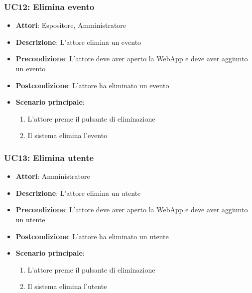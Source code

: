\subsubsection{UC12: Elimina evento}
\label{subsubsec:uc12}
\begin{itemize}
    \item \textbf{Attori}: Espositore, Amministratore
    \item \textbf{Descrizione}: L'attore elimina un evento
    \item \textbf{Precondizione}: L'attore deve aver aperto la WebApp e deve aver aggiunto un evento
    \item \textbf{Postcondizione}: L'attore ha eliminato un evento
    \item \textbf{Scenario principale}:
    \begin{enumerate}
        \item L'attore preme il pulsante di eliminazione
        \item Il sistema elimina l'evento
    \end{enumerate}
\end{itemize}

\subsubsection{UC13: Elimina utente}
\label{subsubsec:uc13}
\begin{itemize}
    \item \textbf{Attori}: Amministratore
    \item \textbf{Descrizione}: L'attore elimina un utente
    \item \textbf{Precondizione}: L'attore deve aver aperto la WebApp e deve aver aggiunto un utente
    \item \textbf{Postcondizione}: L'attore ha eliminato un utente
    \item \textbf{Scenario principale}:
    \begin{enumerate}
        \item L'attore preme il pulsante di eliminazione
        \item Il sistema elimina l'utente
    \end{enumerate}
\end{itemize}

